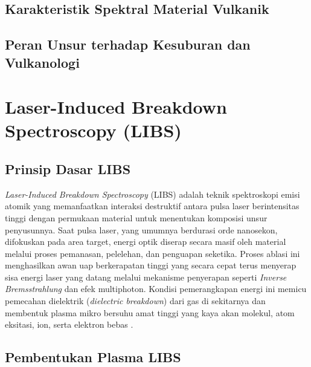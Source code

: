 \subsection{Karakteristik Spektral Material Vulkanik}

\subsection{Peran Unsur terhadap Kesuburan dan Vulkanologi}


\section{Laser-Induced Breakdown Spectroscopy (LIBS)}

\subsection{Prinsip Dasar LIBS}

\textit{Laser-Induced Breakdown Spectroscopy} (LIBS) adalah teknik spektroskopi emisi atomik yang memanfaatkan interaksi destruktif antara pulsa laser berintensitas tinggi dengan permukaan material untuk menentukan komposisi unsur penyusunnya. Saat pulsa laser, yang umumnya berdurasi orde nanosekon, difokuskan pada area target, energi optik diserap secara masif oleh material melalui proses pemanasan, pelelehan, dan penguapan seketika. Proses ablasi ini menghasilkan awan uap berkerapatan tinggi yang secara cepat terus menyerap sisa energi laser yang datang melalui mekanisme penyerapan seperti \textit{Inverse Bremsstrahlung} dan efek multiphoton. Kondisi pemerangkapan energi ini memicu pemecahan dielektrik (\textit{dielectric breakdown}) dari gas di sekitarnya dan membentuk plasma mikro bersuhu amat tinggi yang kaya akan molekul, atom eksitasi, ion, serta elektron bebas \citep{legnaioli_laser-induced_2025}.

\subsection{Pembentukan Plasma LIBS}

